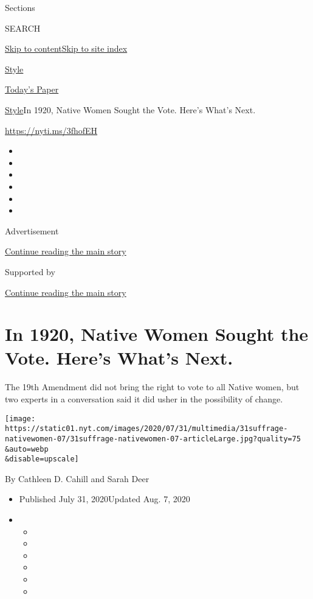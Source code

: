 Sections

SEARCH

\protect\hyperlink{site-content}{Skip to
content}\protect\hyperlink{site-index}{Skip to site index}

\href{https://www.nytimes.com/section/style}{Style}

\href{https://myaccount.nytimes.com/auth/login?response_type=cookie\&client_id=vi}{}

\href{https://www.nytimes.com/section/todayspaper}{Today's Paper}

\href{/section/style}{Style}\textbar{}In 1920, Native Women Sought the
Vote. Here's What's Next.

\href{https://nyti.ms/3fhofEH}{https://nyti.ms/3fhofEH}

\begin{itemize}
\item
\item
\item
\item
\item
\item
\end{itemize}

Advertisement

\protect\hyperlink{after-top}{Continue reading the main story}

Supported by

\protect\hyperlink{after-sponsor}{Continue reading the main story}

\hypertarget{in-1920-native-women-sought-the-vote-heres-whats-next}{%
\section{In 1920, Native Women Sought the Vote. Here's What's
Next.}\label{in-1920-native-women-sought-the-vote-heres-whats-next}}

The 19th Amendment did not bring the right to vote to all Native women,
but two experts in a conversation said it did usher in the possibility
of change.

\texttt{[image: https://static01.nyt.com/images/2020/07/31/multimedia/31suffrage-nativewomen-07/31suffrage-nativewomen-07-articleLarge.jpg?quality=75\\\&auto=webp\\\&disable=upscale]}

By Cathleen D. Cahill and Sarah Deer

\begin{itemize}
\item
  Published July 31, 2020Updated Aug. 7, 2020
\item
  \begin{itemize}
  \item
  \item
  \item
  \item
  \item
  \item
  \end{itemize}
\end{itemize}

